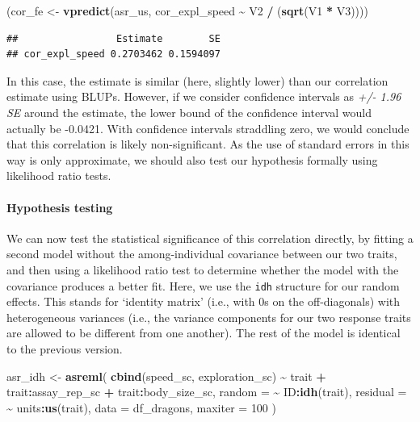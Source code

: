 \documentclass[
  12pt,
]{book}
\newenvironment{Shaded}{\begin{snugshade}}{\end{snugshade}}
\newcommand{\DataTypeTok}[1]{\textcolor[rgb]{0.13,0.29,0.53}{#1}}
\newcommand{\DecValTok}[1]{\textcolor[rgb]{0.00,0.00,0.81}{#1}}
\newcommand{\KeywordTok}[1]{\textcolor[rgb]{0.13,0.29,0.53}{\textbf{#1}}}
\newcommand{\NormalTok}[1]{#1}
\newcommand{\OperatorTok}[1]{\textcolor[rgb]{0.81,0.36,0.00}{\textbf{#1}}}
\newcommand{\StringTok}[1]{\textcolor[rgb]{0.31,0.60,0.02}{#1}}
\begin{document}
\begin{Shaded}
\begin{Highlighting}[]
\NormalTok{(cor\_fe \textless{}{-}}\StringTok{ }\KeywordTok{vpredict}\NormalTok{(asr\_us, cor\_expl\_speed }\OperatorTok{\textasciitilde{}}\StringTok{ }\NormalTok{V2 }\OperatorTok{/}\StringTok{ }\NormalTok{(}\KeywordTok{sqrt}\NormalTok{(V1 }\OperatorTok{*}\StringTok{ }\NormalTok{V3))))}
\end{Highlighting}
\end{Shaded}

\begin{verbatim}
##                 Estimate        SE
## cor_expl_speed 0.2703462 0.1594097
\end{verbatim}

In this case, the estimate is similar (here, slightly lower) than our correlation estimate using BLUPs.
However, if we consider confidence intervals as \emph{+/- 1.96 SE} around the estimate, the lower bound of the confidence interval would actually be -0.0421.
With confidence intervals straddling zero, we would conclude that this correlation is likely non-significant.
As the use of standard errors in this way is only approximate, we should also test our hypothesis formally using likelihood ratio tests.

\hypertarget{hypothesis-testing}{%
\paragraph{Hypothesis testing}\label{hypothesis-testing}}

We can now test the statistical significance of this correlation directly, by fitting a second model without the among-individual covariance between our two traits, and then using a likelihood ratio test to determine whether the model with the covariance produces a better fit.
Here, we use the \texttt{idh} structure for our random effects. This stands for `identity matrix' (i.e., with 0s on the off-diagonals) with heterogeneous variances (i.e., the variance components for our two response traits are allowed to be different from one another).
The rest of the model is identical to the previous version.

\begin{Shaded}
\begin{Highlighting}[]
\NormalTok{asr\_idh \textless{}{-}}\StringTok{ }\KeywordTok{asreml}\NormalTok{(}
  \KeywordTok{cbind}\NormalTok{(speed\_sc, exploration\_sc) }\OperatorTok{\textasciitilde{}}\StringTok{ }\NormalTok{trait }\OperatorTok{+}
\StringTok{    }\NormalTok{trait}\OperatorTok{:}\NormalTok{assay\_rep\_sc }\OperatorTok{+}\StringTok{ }\NormalTok{trait}\OperatorTok{:}\NormalTok{body\_size\_sc,}
  \DataTypeTok{random =} \OperatorTok{\textasciitilde{}}\StringTok{ }\NormalTok{ID}\OperatorTok{:}\KeywordTok{idh}\NormalTok{(trait),}
  \DataTypeTok{residual =} \OperatorTok{\textasciitilde{}}\StringTok{ }\NormalTok{units}\OperatorTok{:}\KeywordTok{us}\NormalTok{(trait),}
  \DataTypeTok{data =}\NormalTok{ df\_dragons,}
  \DataTypeTok{maxiter =} \DecValTok{100}
\NormalTok{)}
\end{Highlighting}
\end{Shaded}
\end{document}
